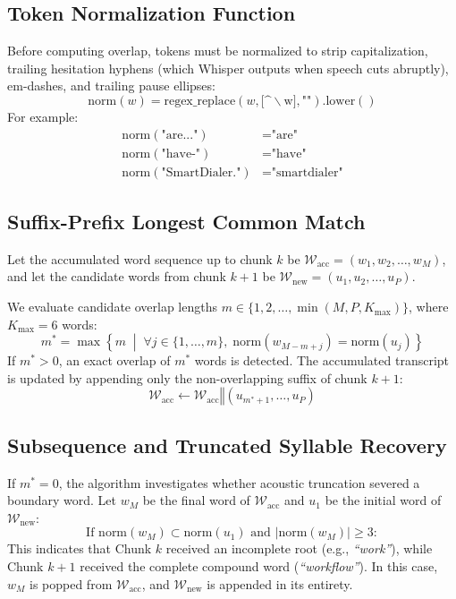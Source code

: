 \documentclass[11pt,a4paper,titlepage]{report}
\begin{document}
\subsection{Token Normalization Function}
Before computing overlap, tokens must be normalized to strip capitalization, trailing hesitation hyphens (which Whisper outputs when speech cuts abruptly), em-dashes, and trailing pause ellipses:
\begin{equation}
    \text{norm}(w) = \text{regex\_replace}(w, \texttt{[}\text{\textasciicircum}\backslash\text{w}\texttt{]}, \text{""}).\text{lower}()
\end{equation}
For example:
\begin{align*}
    \text{norm}(\text{"are..."}) &= \text{"are"} \\
    \text{norm}(\text{"have-"}) &= \text{"have"} \\
    \text{norm}(\text{"SmartDialer."}) &= \text{"smartdialer"}
\end{align*}

\subsection{Suffix-Prefix Longest Common Match}
Let the accumulated word sequence up to chunk $k$ be $\mathcal{W}_{\text{acc}} = (w_1, w_2, \dots, w_M)$, and let the candidate words from chunk $k+1$ be $\mathcal{W}_{\text{new}} = (u_1, u_2, \dots, u_P)$.

We evaluate candidate overlap lengths $m \in \{1, 2, \dots, \min(M, P, K_{\text{max}})\}$, where $K_{\text{max}} = 6$ words:
\begin{equation}
    m^* = \max \left\{ m \;\middle|\; \forall j \in \{1, \dots, m\}, \; \text{norm}(w_{M - m + j}) = \text{norm}(u_j) \right\}
\end{equation}
If $m^* > 0$, an exact overlap of $m^*$ words is detected. The accumulated transcript is updated by appending only the non-overlapping suffix of chunk $k+1$:
\begin{equation}
    \mathcal{W}_{\text{acc}} \leftarrow \mathcal{W}_{\text{acc}} \mathbin{\Vert} (u_{m^*+1}, \dots, u_P)
\end{equation}

\subsection{Subsequence and Truncated Syllable Recovery}
If $m^* = 0$, the algorithm investigates whether acoustic truncation severed a boundary word. Let $w_M$ be the final word of $\mathcal{W}_{\text{acc}}$ and $u_1$ be the initial word of $\mathcal{W}_{\text{new}}$:
\begin{equation}
    \text{If } \text{norm}(w_M) \subset \text{norm}(u_1) \text{ and } |\text{norm}(w_M)| \ge 3:
\end{equation}
This indicates that Chunk $k$ received an incomplete root (e.g., \textit{``work''}), while Chunk $k+1$ received the complete compound word (\textit{``workflow''}). In this case, $w_M$ is popped from $\mathcal{W}_{\text{acc}}$, and $\mathcal{W}_{\text{new}}$ is appended in its entirety.
\end{document}
